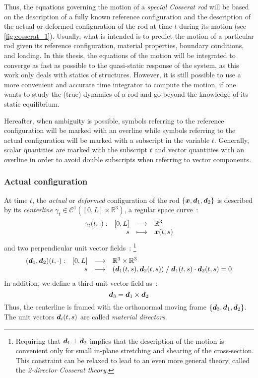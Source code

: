 Thus, the equations governing the motion of a \emph{special Cosserat rod} will be based on the description of a fully known reference configuration and the description of the actual or deformed configuration of the rod at time $t$ during its motion (see \cref{fig:cosserat_1}). Usually, what is intended is to predict the motion of a particular rod given its reference configuration, material properties, boundary conditions, and loading. In this thesis, the equations of the motion will be integrated to converge as fast as possible to the quasi-static response of the system, as this work only deals with statics of structures. However, it is still possible to use a more convenient and accurate time integrator to compute the motion, if  one wants to study the (true) dynamics of a rod and go beyond the knowledge of its static equilibrium.

Hereafter, when ambiguity is possible, symbols referring to the reference configuration will be marked with an overline while symbols referring to the actual configuration will be marked with a subscript in the variable $t$. Generally, scalar quantities are marked with the subscript $t$ and vector quantities with an overline in order to avoid double subscripts when referring to vector components.

\subsubsection{Actual configuration}

At time $t$, the \emph{actual} or \emph{deformed} configuration of the rod $\{{\boldsymbol{x}}, {\boldsymbol{d}_1}, {\boldsymbol{d}_2}\}$ is described by its \emph{centerline} $\gamma_t \in \mathcal{C}^1([0,{L}]\times \mathbb{R}^3)$, a regular space curve~:
\begin{equation}
	\begin{array}{lrcl} \gamma_t(t, \cdot): & [0,{L}] & \longrightarrow & \mathbb{R}^3 \\ & {s} & \longmapsto & \boldsymbol{x}(t,{s}) \end{array}
\end{equation}
and two perpendicular unit vector fields~: \footnote{Requiring that  $\boldsymbol{d}_1 \perp \boldsymbol{d}_2$ implies that the description of the motion is convenient only for small in-plane stretching and shearing of the cross-section. This constraint can be relaxed to lead to an even more general theory, called the \emph{2-director Cosserat theory}.}
\begin{equation}
	\begin{array}{lrcl} (\boldsymbol{d}_1,\boldsymbol{d}_2)(t, \cdot): & [0,{L}] & \longrightarrow & \mathbb{R}^3 \times \mathbb{R}^3 \\ & {s} & \longmapsto & (\boldsymbol{d}_1(t,{s}), \boldsymbol{d}_2(t,{s})) \; / \;
	\boldsymbol{d}_1(t,{s}) \cdot \boldsymbol{d}_2(t,{s}) = 0
	 \end{array}
\end{equation}
In addition, we define a third unit vector field as~:
\begin{equation}
	\boldsymbol{d}_3 = \boldsymbol{d}_1 \times \boldsymbol{d}_2
\end{equation}
Thus, the centerline is framed with the orthonormal moving frame $\{\boldsymbol{d}_3, \boldsymbol{d}_1, \boldsymbol{d}_2\}$. The unit vectors $\boldsymbol{d}_i(t,{s})$ are called \emph{material directors}.

